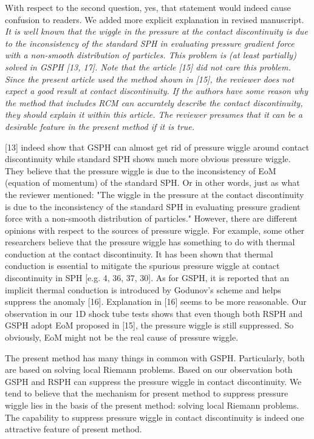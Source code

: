 \documentclass[10pt,a4paper]{article}
\begin{document}
With respect to the second question, yes, that statement would indeed cause confusion to readers. We added more explicit explanation in revised manuscript.
\\[3pt]

\textit {It is well known that the wiggle in the pressure at the contact discontinuity is due to the inconsistency of the standard SPH in evaluating pressure gradient force with a non-smooth distribution of particles. This problem is (at least partially) solved in GSPH [13, 17]. Note that the article [15] did not care this problem. Since the present article used the method shown in [15], the reviewer does not expect a good result at contact discontinuity. If the authors have some reason why the method that includes RCM can accurately describe the contact discontinuity, they should explain it within this article. The reviewer
presumes that it can be a desirable feature in the present method if it is true.}

[13] indeed show that GSPH can almost get rid of pressure wiggle around contact discontinuity while standard SPH shows much more obvious pressure wiggle. They believe that the pressure wiggle is due to the inconsistency of EoM (equation of momentum) of the standard SPH. Or in other words, just as what the reviewer mentioned: "The wiggle in the pressure at the contact discontinuity is due to the inconsistency of the standard SPH in evaluating pressure gradient force with a non-smooth distribution of particles." However, there are different opinions with respect to the sources of pressure wiggle. For example, some other researchers believe that the pressure wiggle has something to do with thermal conduction at the contact discontinuity. It has been shown that thermal conduction is essential to mitigate the spurious pressure wiggle at contact discontinuity in SPH [e.g. 4, 36, 37, 30]. As for GSPH, it is reported that an implicit thermal conduction is introduced by Godunov's scheme and helps suppress the anomaly [16]. Explanation in [16] seems to be more reasonable. Our observation in our 1D shock tube tests shows that even though both RSPH and GSPH adopt EoM proposed in [15], the pressure wiggle is still  suppressed. So obviously, EoM might not be the real cause of pressure wiggle. 

The present method has many things in common with GSPH. Particularly, both are based on solving local Riemann problems. Based on our observation both GSPH and RSPH  can suppress the pressure wiggle in contact discontinuity. We tend to believe that the mechanism for present method to suppress pressure wiggle lies in the basis of the  present method: solving local Riemann problems. 
The capability to suppress pressure wiggle in contact discontinuity is indeed one attractive feature of present method.
\end{document}
